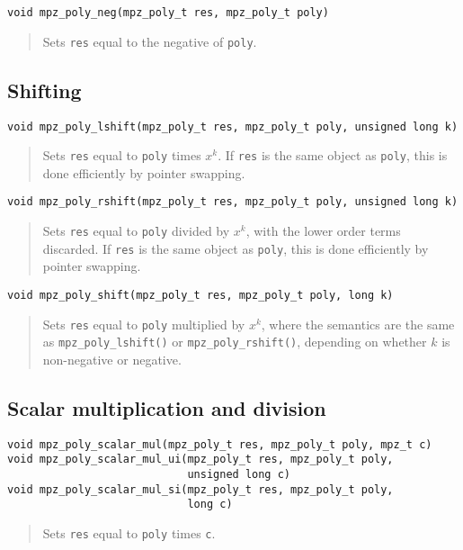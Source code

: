 \documentclass[a4paper,10pt]{article}
\newcommand{\code}{\lstinline}
\begin{document}
\begin{lstlisting}
void mpz_poly_neg(mpz_poly_t res, mpz_poly_t poly)
\end{lstlisting}
\begin{quote}
Sets \code{res} equal to the negative of \code{poly}.
\end{quote}


\subsection{Shifting}

\begin{lstlisting}
void mpz_poly_lshift(mpz_poly_t res, mpz_poly_t poly, unsigned long k)
\end{lstlisting}
\begin{quote}
Sets \code{res} equal to \code{poly} times $x^k$. If \code{res} is the same object as \code{poly}, this is done efficiently by pointer swapping.
\end{quote}

\begin{lstlisting}
void mpz_poly_rshift(mpz_poly_t res, mpz_poly_t poly, unsigned long k)
\end{lstlisting}
\begin{quote}
Sets \code{res} equal to \code{poly} divided by $x^k$, with the lower order terms discarded. If \code{res} is the same object as \code{poly}, this is done efficiently by pointer swapping.
\end{quote}

\begin{lstlisting}
void mpz_poly_shift(mpz_poly_t res, mpz_poly_t poly, long k)
\end{lstlisting}
\begin{quote}
Sets \code{res} equal to \code{poly} multiplied by $x^k$, where the semantics are the same as \code{mpz_poly_lshift()} or \code{mpz_poly_rshift()}, depending on whether $k$ is non-negative or negative.
\end{quote}


\subsection{Scalar multiplication and division}

\begin{lstlisting}
void mpz_poly_scalar_mul(mpz_poly_t res, mpz_poly_t poly, mpz_t c)
void mpz_poly_scalar_mul_ui(mpz_poly_t res, mpz_poly_t poly,
                            unsigned long c)
void mpz_poly_scalar_mul_si(mpz_poly_t res, mpz_poly_t poly,
                            long c)
\end{lstlisting}
\begin{quote}
Sets \code{res} equal to \code{poly} times \code{c}.
\end{quote}
\end{document}
